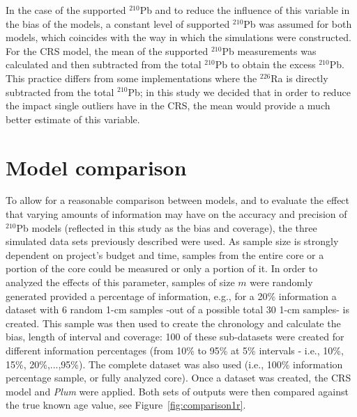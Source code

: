 \documentclass [10pt] {article}
\newcommand{\ac}{\color{red} }  %
\newcommand{\ca}{\color{black}} %
\begin{document}
In the case of the supported $^{210}$Pb and to reduce the influence of this variable in the bias of the models, a constant level of supported $^{210}$Pb was assumed for both models, which coincides with the way in which the simulations were constructed.
For the CRS model, the mean of the supported $^{210}$Pb measurements was calculated and then subtracted from the total $^{210}$Pb to obtain the excess $^{210}$Pb.
This practice differs from some implementations where the $^{226}$Ra is directly subtracted from the total $^{210}$Pb; in this study we decided that in order to reduce the impact single outliers have in the CRS, the mean would provide a much better estimate of this variable.



\section{Model comparison}

To allow for a reasonable comparison between models, and to evaluate the effect that varying amounts of information may have on the accuracy and precision of $^{210}$Pb models (reflected in this study as the bias and coverage), the three simulated data sets previously described were used. 
As sample size is strongly dependent on project's budget and time, samples from the entire core or a portion of the core could be measured or only a portion of it.
In order to analyzed the effects of this parameter, samples of size $m$ were randomly generated provided a percentage of information, e.g., for a 20\% information a dataset with 6 random 1-cm samples -out of a possible total 30 1-cm samples- is created.
This sample was then used to create the chronology and calculate the bias, length of interval and coverage:
100 of these sub-datasets were created for different information percentages (from 10\% to 95\% at 5\% intervals - i.e., 10\%, 15\%, 20\%,...,95\%). 
The complete dataset was also used (i.e., 100\% information percentage sample, or fully analyzed core).
Once a dataset was created, the CRS model and \textit{Plum} were applied. %
Both sets of outputs were then compared against the true known age value, see Figure~\ref{fig:comparison1r}.
\end{document}
